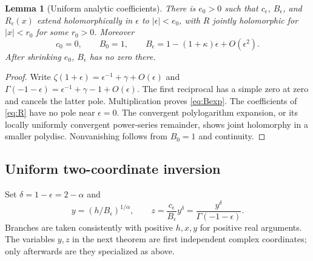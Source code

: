 \documentclass[11pt,a4paper]{article}
\numberwithin{equation}{section}
\newtheorem{lemma}[theorem]{Lemma}
\theoremstyle{definition}
\theoremstyle{remark}
\newcommand{\ee}{\epsilon}
\begin{document}
\begin{lemma}[Uniform analytic coefficients]\label{lem:analytic}
There is $e_0>0$ such that $c_\ee$, $B_\ee$, and $R_\ee(x)$ extend
holomorphically in $\ee$ to $|\ee|<e_0$, with $R$ jointly holomorphic for
$|x|<r_0$ for some $r_0>0$. Moreover
\begin{equation}\label{eq:Bexp}
 c_0=0,\qquad B_0=1,\qquad
 B_\ee=1-(1+\kappa)\ee+O(\ee^2).
\end{equation}
After shrinking $e_0$, $B_\ee$ has no zero there.
\end{lemma}
\begin{proof}
Write $\zeta(1+\ee)=\ee^{-1}+\gamma+O(\ee)$ and
$\Gamma(-1-\ee)=\ee^{-1}+\gamma-1+O(\ee)$.
The first reciprocal has a simple zero at zero and cancels the latter
pole. Multiplication proves \eqref{eq:Bexp}. The coefficients of
\eqref{eq:R} have no pole near $\ee=0$. The convergent polylogarithm
expansion, or its locally uniformly convergent power-series remainder,
shows joint holomorphy in a smaller polydisc. Nonvanishing follows from
$B_0=1$ and continuity.
\end{proof}

\subsection{Uniform two-coordinate inversion}
Set $\delta=1-\ee=2-\alpha$ and
\begin{equation}\label{eq:chartcoordinates}
 y=(h/B_\ee)^{1/\alpha},\qquad
 z=\frac{c_\ee}{B_\ee}y^\delta
   =\frac{y^\delta}{\Gamma(-1-\ee)}.
\end{equation}
Branches are taken consistently with positive $h,x,y$ for positive real
arguments. The variables $y,z$ in the next theorem are first independent
complex coordinates; only afterwards are they specialized as above.
\end{document}
